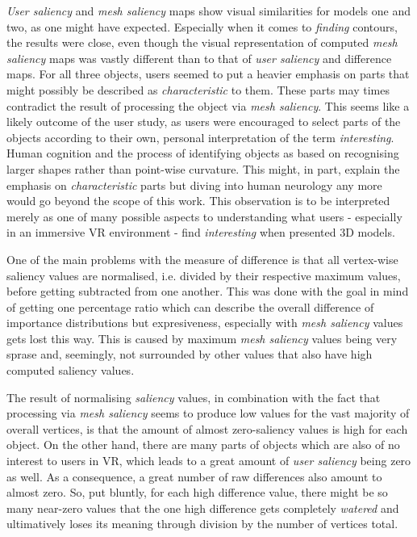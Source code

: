 \textit{User saliency} and \textit{mesh saliency} maps show visual similarities for models one and two, as one might have expected. Especially when it comes to \textit{finding} contours, the results were close, even though the visual representation of computed \textit{mesh saliency} maps was vastly different than to that of \textit{user saliency} and difference maps. For all three objects, users seemed to put a heavier emphasis on parts that might possibly be described as \textit{characteristic} to them. These parts may times contradict the result of processing the object via \textit{mesh saliency}. This seems like a likely outcome of the user study, as users were encouraged to select parts of the objects according to their own, personal interpretation of the term \textit{interesting}. Human cognition and the process of identifying objects as based on recognising larger shapes rather than point-wise curvature. This might, in part, explain the emphasis on \textit{characteristic} parts but diving into human neurology any more would go beyond the scope of this work. This observation is to be interpreted merely as one of many possible aspects to understanding what users - especially in an immersive VR environment - find \textit{interesting} when presented 3D models.

One of the main problems with the measure of difference is that all vertex-wise saliency values are normalised, i.e. divided by their respective maximum values, before getting subtracted from one another. This was done with the goal in mind of getting one percentage ratio which can describe the overall difference of importance distributions but expresiveness, especially with \textit{mesh saliency} values gets lost this way. This is caused by maximum \textit{mesh saliency} values being very sprase and, seemingly, not surrounded by other values that also have high computed saliency values.

The result of normalising \textit{saliency} values, in combination with the fact that processing via \textit{mesh saliency} seems to produce low values for the vast majority of overall vertices, is that the amount of almost zero-saliency values is high for each object. On the other hand, there are many parts of objects which are also of no interest to users in VR, which leads to a great amount of \textit{user saliency} being zero as well. As a consequence, a great number of raw differences also amount to almost zero. So, put bluntly, for each high difference value, there might be so many near-zero values that the one high difference gets completely \textit{watered} and ultimatively loses its meaning through division by the number of vertices total.


